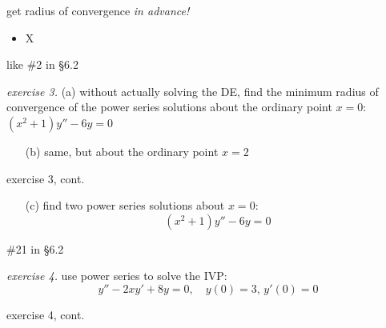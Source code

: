 \documentclass[urlcolor=blue,dvipsnames]{beamer}
\begin{document}
\begin{frame}{get radius of convergence \emph{in advance!}}

\begin{itemize}
\item X
\end{itemize}
\end{frame}


\begin{frame}{like \#2 in \S 6.2}

\noindent \emph{exercise 3.}  {\color{Blue} (a)} without actually solving the DE, find the minimum radius of convergence of the power series solutions about the ordinary point $x=0$:  \qquad $(x^2+1) y'' - 6 y = 0$

\vspace{20mm}
\begin{itemize}
\item[(b)] same, but about the ordinary point $x=2$
\end{itemize}

\vspace{20mm}
\end{frame}


\begin{frame}{exercise 3, cont.}

\begin{itemize}
\item[(c)] find two power series solutions about $x=0$:
    $$(x^2+1) y'' - 6 y = 0$$
\end{itemize}

\vspace{60mm}
\end{frame}


\begin{frame}{\#21 in \S 6.2}

\noindent \emph{exercise 4.}  use power series to solve the IVP:
    $$y'' - 2 x y' + 8 y = 0, \quad y(0)=3, \, y'(0)=0$$

\vspace{50mm}
\end{frame}


\begin{frame}{exercise 4, cont.}

\end{frame}
\end{document}
